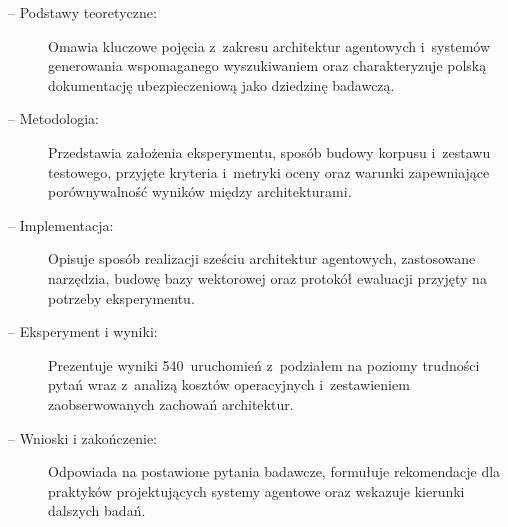 \begin{description}
  \item[ -- Podstawy teoretyczne:] Omawia kluczowe pojęcia z~zakresu architektur agentowych i~systemów generowania wspomaganego wyszukiwaniem oraz charakteryzuje polską dokumentację ubezpieczeniową jako dziedzinę badawczą.

  \item[ -- Metodologia:] Przedstawia założenia eksperymentu, sposób budowy korpusu i~zestawu testowego, przyjęte kryteria i~metryki oceny oraz warunki zapewniające porównywalność wyników między architekturami.

  \item[ -- Implementacja:] Opisuje sposób realizacji sześciu architektur agentowych, zastosowane narzędzia, budowę bazy wektorowej oraz protokół ewaluacji przyjęty na potrzeby eksperymentu.

  \item[ -- Eksperyment i wyniki:] Prezentuje wyniki 540~uruchomień z~podziałem na poziomy trudności pytań wraz z~analizą kosztów operacyjnych i~zestawieniem zaobserwowanych zachowań architektur.

  \item[ -- Wnioski i zakończenie:] Odpowiada na postawione pytania badawcze, formułuje rekomendacje dla praktyków projektujących systemy agentowe oraz wskazuje kierunki dalszych badań.
\end{description}
